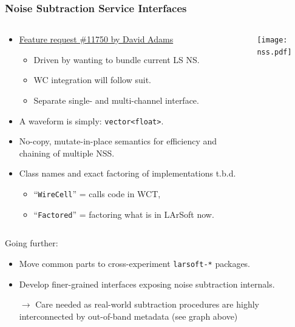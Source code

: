 \documentclass[xcolor=dvipsnames]{beamer}
\begin{document}
\begin{frame}[fragile]
  \frametitle{Noise Subtraction Service Interfaces}
  \footnotesize
  \begin{columns}
    \begin{column}{0.65\textwidth}
      \begin{itemize}
      \item \href{https://cdcvs.fnal.gov/redmine/issues/11750}{Feature request \#11750 by David Adams}
        \begin{itemize}\scriptsize
        \item Driven by wanting to bundle current LS NS.
        \item WC integration will follow suit.
        \item Separate single- and multi-channel interface.
        \end{itemize}
      \item A waveform is simply: \verb|vector<float>|.
      \item No-copy, mutate-in-place semantics for efficiency and chaining of multiple NSS.
      \item Class names and exact factoring of implementations t.b.d. 
        \begin{itemize}\scriptsize
        \item ``\texttt{WireCell}'' = calls code in WCT, 
        \item ``\texttt{Factored}'' = factoring what is in LArSoft now.
        \end{itemize}
      \end{itemize}
    \end{column}
    \begin{column}{0.4\textwidth}
      \texttt{[image: nss.pdf]}          
    \end{column}
  \end{columns}



  \vfill

  Going further: 
  \begin{itemize}
  \item Move common parts to cross-experiment \texttt{larsoft-*} packages.
  \item Develop finer-grained interfaces exposing noise subtraction internals.
  \item[$\rightarrow$] Care needed as real-world subtraction procedures are highly interconnected by out-of-band metadata (see graph above)
  \end{itemize}

\end{frame}
\end{document}
